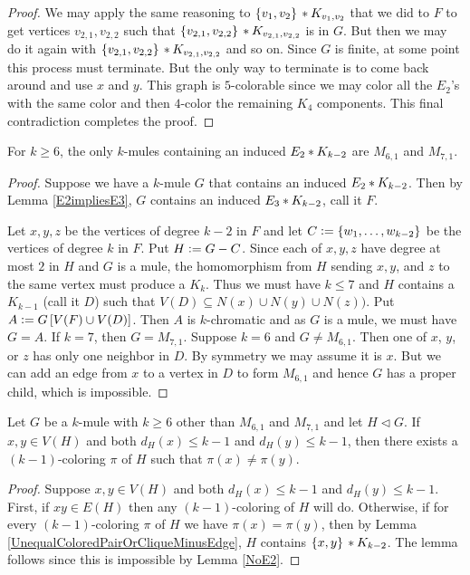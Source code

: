\begin{proof}
We may apply the same reasoning to $\left\{ v_1, v_2 \right\} \mbox{\hspace{2 pt}$\ast$\hspace{2 pt}} K_{v_1, v_2}$ that we did to $F$ to get vertices $v_{2,1}, v_{2,2}$ 
such that $\left\{ v_{2,1}, v_{2,2} \right\} \mbox{\hspace{2 pt}$\ast$\hspace{2 pt}} K_{v_{2,1}, v_{2,2}}$ is in $G$.  But then we may do it again with $\left\{ v_{2,1}, v_{2,2} \right\} \mbox{\hspace{2 pt}$\ast$\hspace{2 pt}} K_{v_{2,1}, v_{2,2}}$ and so on.  
Since $G$ is finite, at some point this process must terminate. But the only way to terminate is to come back around and use $x$ and $y$.  
This graph is $5$-colorable since we may color all the $E_2$'s with the same color and then $4$-color the remaining $K_4$ components.  
This final contradiction completes the proof.
\end{proof}




\begin{lem}\label{NoE2}
For $k \geq 6$, the only $k$-mules containing an induced $E_2 \mbox{\hspace{2 pt}$\ast$\hspace{2 pt}} K_{k - 2}$
are $M_{6,1}$ and $M_{7,1}$.
\end{lem}
\begin{proof}
Suppose we have a $k$-mule $G$ that contains an induced $E_2 \mbox{\hspace{2 pt}$\ast$\hspace{2 pt}} K_{k - 2}$. 
Then by Lemma \ref{E2impliesE3}, $G$ contains an induced $E_3 \mbox{\hspace{2 pt}$\ast$\hspace{2 pt}} K_{k - 2}$, call it $F$. 

Let $x, y, z$ be the vertices of degree $k-2$ in
$F$ and let $C \mathrel{\mathop:}= \left\{ w_1, \ldots, w_{k-2} \right\}$ be the vertices of degree
$k$ in $F$. Put $H \mathrel{\mathop:}= G - C$. Since each of $x, y, z$ have degree at
most $2$ in $H$ and $G$ is a mule, the homomorphism from $H$ sending $x, y$, and
$z$ to the same vertex must produce a $K_k$.  Thus we must have $k \leq 7$ and
$H$ contains a $K_{k-1}$ (call it $D$) such that $V(D) \subseteq N(x) \cup N(y)
\cup N(z))$.  Put $A \mathrel{\mathop:}= G\left[ V(F) \cup V(D) \right]$.  Then $A$ is
$k$-chromatic and as $G$ is a mule, we must have $G = A$.  If $k = 7$, then $G
= M_{7,1}$.  Suppose $k=6$ and $G \neq M_{6,1}$. Then one of $x$, $y$, or $z$
has only one neighbor in $D$.  By symmetry we may assume it is $x$.  But we can
add an edge from $x$ to a vertex in $D$ to form $M_{6,1}$ and hence $G$ has a
proper child, which is impossible.
\end{proof}

\begin{lem}\label{UnequalColoredPair}
Let $G$ be a $k$-mule with $k \geq 6$ other than $M_{6,1}$ and $M_{7,1}$ and let
$H \lhd G$. If $x, y \in V(H)$ and both $d_H(x) \leq k-1$ and $d_H(y) \leq k-1$, then there exists a $(k - 1)$-coloring $\pi$ of $H$ such that $\pi(x) \neq \pi(y)$.
\end{lem}
\begin{proof}
Suppose $x, y \in V(H)$ and both $d_H(x) \leq k-1$ and $d_H(y) \leq k-1$.  
First, if $xy \in E(H)$ then any $(k - 1)$-coloring of $H$ will do.  
Otherwise, if for every $(k - 1)$-coloring $\pi$ of $H$ we have $\pi(x) = \pi(y)$, then by Lemma \ref{UnequalColoredPairOrCliqueMinusEdge}, 
$H$ contains $\left\{ x, y \right\} \mbox{\hspace{2 pt}$\ast$\hspace{2 pt}} K_{k-2}$.  The lemma follows since this is impossible by Lemma \ref{NoE2}.
\end{proof}

